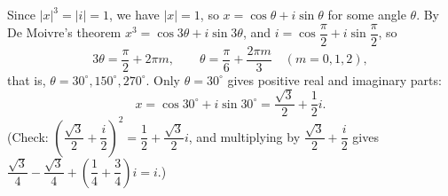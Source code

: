 Since $|x|^3=|i|=1$, we have $|x|=1$, so $x=\cos\theta+i\sin\theta$ for some angle $\theta$. By De Moivre's theorem $x^3=\cos3\theta+i\sin3\theta$, and $i=\cos\dfrac{\pi}{2}+i\sin\dfrac{\pi}{2}$, so
\[3\theta=\dfrac{\pi}{2}+2\pi m,\qquad\theta=\dfrac{\pi}{6}+\dfrac{2\pi m}{3}\quad(m=0,1,2),\]
that is, $\theta=30^\circ,150^\circ,270^\circ$. Only $\theta=30^\circ$ gives positive real and imaginary parts:
\[x=\cos30^\circ+i\sin30^\circ=\boxed{\dfrac{\sqrt3}{2}+\dfrac{1}{2}i}.\]
(Check: $\left(\dfrac{\sqrt3}{2}+\dfrac {i}{2}\right)^2=\dfrac{1}{2}+\dfrac{\sqrt3}{2}i$, and multiplying by $\dfrac{\sqrt3}{2}+\dfrac {i}{2}$ gives $\dfrac{\sqrt3}{4}-\dfrac{\sqrt3}{4}+\left(\dfrac{1}{4}+\dfrac{3}{4}\right)i=i$.)
